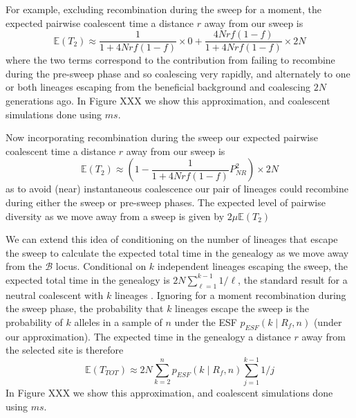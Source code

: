 \documentclass[a4paper,10pt]{article}
\newcommand{\fancyB}{$\mathcal B$ }
\begin{document}
For example, excluding recombination during the sweep for a moment, the expected pairwise coalescent time a distance $r$ away from our sweep is
\begin{equation}
	\mathbb{E}(T_2)\approx \frac{1}{1 + 4Nrf(1-f)} \times 0 + \frac{4Nrf(1-f)}{1 + 4Nrf(1-f)} \times 2N
\end{equation}
where the two terms correspond to the contribution from failing to recombine during the pre-sweep phase and so coalescing very rapidly, and alternately to one or both lineages escaping from the beneficial background and coalescing $2N$ generations ago. In Figure XXX we show this approximation, and coalescent simulations done using $ms$. 

Now incorporating recombination during the sweep our expected pairwise coalescent time a distance $r$ away from our sweep is 
\begin{equation}
	\mathbb{E}(T_2) \approx \left(1-\frac{1}{1 + 4Nrf(1-f)} P_{NR}^2  \right) \times 2N
\end{equation}
as to avoid (near) instantaneous coalescence our pair of lineages could recombine during either the sweep or pre-sweep phases. The expected level of pairwise diversity as we move away from a sweep is given by $2\mu \mathbb{E}(T_2)$

We can extend this idea of conditioning on the number of lineages that escape the sweep to calculate the expected total time in the genealogy as we move away from the \fancyB locus. Conditional on  $k$ independent lineages escaping the sweep, the expected total time in the genealogy is $2N \sum_{\ell=1}^{k-1} 1/\ell$, the standard result for a neutral coalescent with $k$ lineages \citep{Watterson}. Ignoring for a moment recombination during the sweep phase, the probability that $k$ lineages escape the sweep is the probability of $k$ alleles in a sample of $n$ under the ESF $p_{ESF}(k\mid R_f,n)$ (under our approximation). The expected time in the genealogy a distance $r$ away from the selected site is therefore
\begin{equation}
	\mathbb{E}(T_{TOT})  \approx 2N \sum_{k=2}^n p_{ESF}(k\mid R_f,n)   \sum_{j=1}^{k-1} 1/j
\end{equation}
In Figure XXX we show this approximation, and coalescent simulations done using $ms$. 
\end{document}
